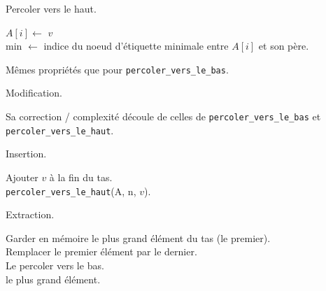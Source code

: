 \documentclass[french, 11pt]{article}
\begin{document}
\begin{defi}{Percoler vers le haut.}{}
    \begin{algorithm}[H]
        \LinesNumbered
        \caption{Percoler vers le haut}
        $A[i] \gets$ $v$\\
        min $\gets$ indice du noeud d'étiquette minimale entre $A[i]$ et son père.\\
    \end{algorithm}
    Mêmes propriétés que pour \texttt{percoler\_vers\_le\_bas}.
\end{defi}

\begin{defi}{Modification.}{}
    \begin{algorithm}[H]
        \LinesNumbered
        \caption{Modification}
    \end{algorithm}
    Sa correction / complexité découle de celles de \texttt{percoler\_vers\_le\_bas} et \texttt{percoler\_vers\_le\_haut}.
\end{defi}

\begin{defi}{Insertion.}{}
    \begin{algorithm}[H]
        \LinesNumbered
        \caption{Insertion}
        Ajouter $v$ à la fin du tas.\\
        \texttt{percoler\_vers\_le\_haut}(A, n, $v$).
    \end{algorithm}
\end{defi}

\begin{defi}{Extraction.}{}
    \begin{algorithm}[H]
        \LinesNumbered
        \caption{Extraction}
        Garder en mémoire le plus grand élément du tas (le premier).\\
        Remplacer le premier élément par le dernier.\\
        Le percoler vers le bas.\\
        \Retour le plus grand élément.
    \end{algorithm}
\end{defi}
\end{document}
